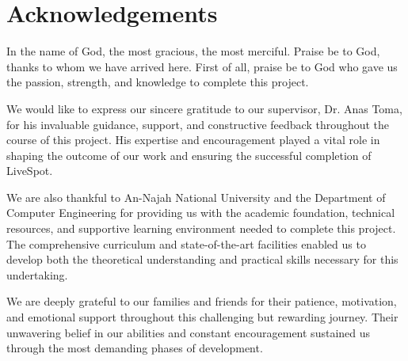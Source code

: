 \chapter*{\center \Large  Acknowledgements}

In the name of God, the most gracious, the most merciful. Praise be to God, thanks to whom we have arrived here. First of all, praise be to God who gave us the passion, strength, and knowledge to complete this project.

We would like to express our sincere gratitude to our supervisor, Dr. Anas Toma, for his invaluable guidance, support, and constructive feedback throughout the course of this project. His expertise and encouragement played a vital role in shaping the outcome of our work and ensuring the successful completion of LiveSpot.

We are also thankful to An-Najah National University and the Department of Computer Engineering for providing us with the academic foundation, technical resources, and supportive learning environment needed to complete this project. The comprehensive curriculum and state-of-the-art facilities enabled us to develop both the theoretical understanding and practical skills necessary for this undertaking.

We are deeply grateful to our families and friends for their patience, motivation, and emotional support throughout this challenging but rewarding journey. Their unwavering belief in our abilities and constant encouragement sustained us through the most demanding phases of development.  

